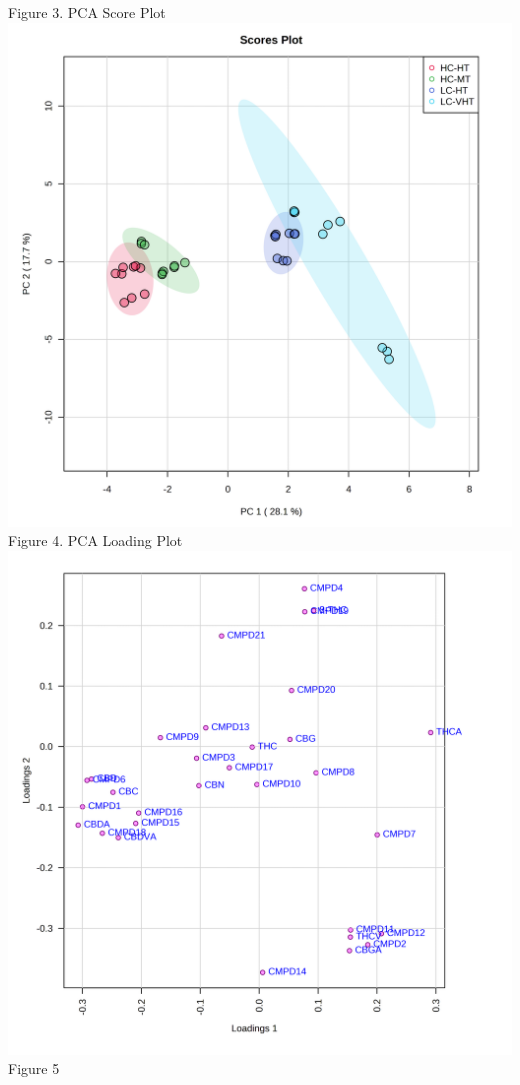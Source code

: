 \documentclass{article}
\begin{document}
{Figure 3. PCA Score Plot}
\includegraphics[scale=0.1]{pca_score2d_1_dpi300.png}
{Figure 4. PCA Loading Plot}
\includegraphics[scale=0.1]{pca_loading_0_dpi300.png}
{Figure 5}
\end{document}
